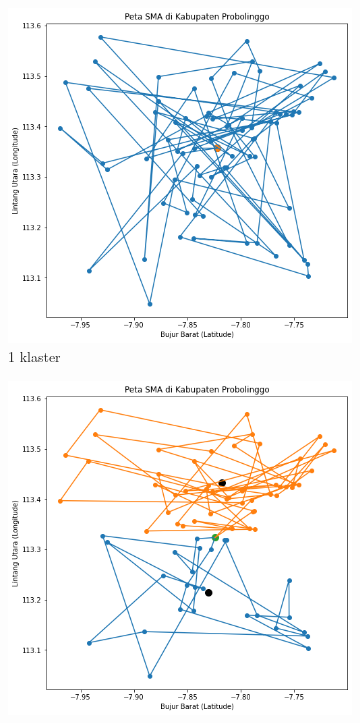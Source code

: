 \begin{figure}[H]
	\centering
	\begin{subfigure}[b]{0.3\textwidth}
		\includegraphics[width=\textwidth]{Gambar/Klaster/1.png}
		\caption{1 klaster}	
	\end{subfigure}
	\hfill
	\begin{subfigure}[b]{0.3\textwidth}
		\includegraphics[width=\textwidth]{Gambar/Klaster/2.png}

\end{subfigure}
\end{figure}
